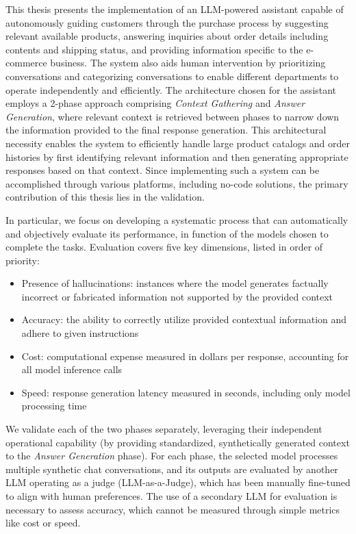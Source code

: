 This thesis presents the implementation of an LLM-powered assistant capable of autonomously guiding customers through the purchase process by suggesting relevant available products, answering inquiries about order details including contents and shipping status, and providing information specific to the e-commerce business.
The system also aids human intervention by prioritizing conversations and categorizing conversations to enable different departments to operate independently and efficiently.
The architecture chosen for the assistant employs a 2-phase approach comprising \textit{Context Gathering} and \textit{Answer Generation}, where relevant context is retrieved between phases to narrow down the information provided to the final response generation.
This architectural necessity enables the system to efficiently handle large product catalogs and order histories by first identifying relevant information and then generating appropriate responses based on that context.
Since implementing such a system can be accomplished through various platforms, including no-code solutions, the primary contribution of this thesis lies in the validation.


In particular, we focus on developing a systematic process that can automatically and objectively evaluate its performance, in function of the models chosen to complete the tasks. Evaluation covers five key dimensions, listed in order of priority:
\begin{itemize}
    \item Presence of hallucinations: instances where the model generates factually incorrect or fabricated information not supported by the provided context
    \item Accuracy: the ability to correctly utilize provided contextual information and adhere to given instructions
    \item Cost: computational expense measured in dollars per response, accounting for all model inference calls
    \item Speed: response generation latency measured in seconds, including only model processing time
\end{itemize}
We validate each of the two phases separately, leveraging their independent operational capability (by providing standardized, synthetically generated context to the \textit{Answer Generation} phase).
For each phase, the selected model processes multiple synthetic chat conversations, and its outputs are evaluated by another LLM operating as a judge (LLM-as-a-Judge), which has been manually fine-tuned to align with human preferences.
The use of a secondary LLM for evaluation is necessary to assess accuracy, which cannot be measured through simple metrics like cost or speed.


